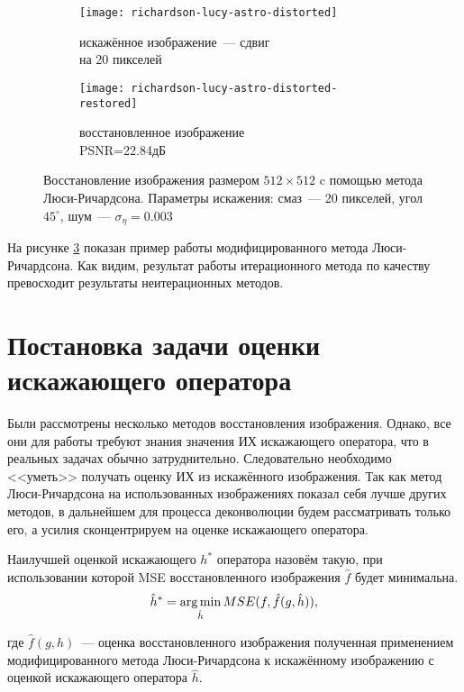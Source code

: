 \begin{figure}[h!]
	\begin{subfigure}[b]{0.5\textwidth}
		\texttt{[image: richardson-lucy-astro-distorted]}
		\caption{искажённое изображение~--- сдвиг \\на 20 пикселей}
		\label{fig:astroLucyBlurred}
	\end{subfigure}%
	\begin{subfigure}[b]{0.5\textwidth}
		\texttt{[image: richardson-lucy-astro-distorted-restored]}
		\caption{восстановленное изображение\\ PSNR=22.84дБ}
		\label{fig:astroLucyRestored}
	\end{subfigure}%
	\caption{Восстановление изображения размером $512\times 512$ c помощью метода Люси-Ричардсона. Параметры искажения: смаз~--- 20 пикселей, угол $45^\circ$, шум~--- $\sigma_\eta=0.003$}
	\label{fig:richardsonLucy}
\end{figure}
На рисунке \ref{fig:richardsonLucy} показан пример работы модифицированного метода Люси-Ричардсона. Как видим, результат работы итерационного метода по качеству превосходит результаты неитерационных методов.


\begin{comment}
\subsection{Слепая деконволюция}
\end{comment}

\section{Постановка задачи оценки искажающего оператора}
Были рассмотрены несколько методов восстановления изображения. Однако, все они для работы требуют знания значения ИХ искажающего оператора, что в реальных задачах обычно затруднительно. Следовательно необходимо  <<уметь>> получать оценку ИХ из искажённого изображения. Так как метод Люси-Ричардсона на использованных изображениях показал себя лучше других методов, в дальнейшем для процесса деконволюции будем рассматривать только его, а усилия сконцентрируем на оценке искажающего оператора.
\begin{definition}\label{def:bestPsfEstimaton}
	Наилучшей оценкой искажающего $h^*$ оператора назовём такую, при использовании которой MSE восстановленного изображения $\hat{f}$ будет минимальна.
	\begin{equation}\label{eq:bestPsf}
	\hat{h}^* = \operatorname*{arg\,min}_{\hat{h}}MSE(f, \hat{f}(g,\hat{h})),
	\end{equation}
\end{definition}
где $\hat{f}(g,h)$~--- оценка восстановленного изображения полученная применением модифицированного метода Люси-Ричардсона к искажённому изображению с оценкой искажающего оператора $\hat{h}$. 

